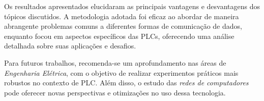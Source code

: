 \documentclass[12pt]{article}
\begin{document}
Os resultados apresentados elucidaram as principais vantagens e desvantagens dos tópicos discutidos. A metodologia adotada foi eficaz ao abordar de maneira abrangente problemas comuns a diferentes formas de comunicação de dados, enquanto focou em aspectos específicos das PLCs, oferecendo uma análise detalhada sobre suas aplicações e desafios.

Para futuros trabalhos, recomenda-se um aprofundamento nas áreas de \textit{Engenharia Elétrica}, com o objetivo de realizar experimentos práticos mais robustos no contexto de PLC. Além disso, o estudo das \textit{redes de computadores} pode oferecer novas perspectivas e otimizações no uso dessa tecnologia.




\end{document}
